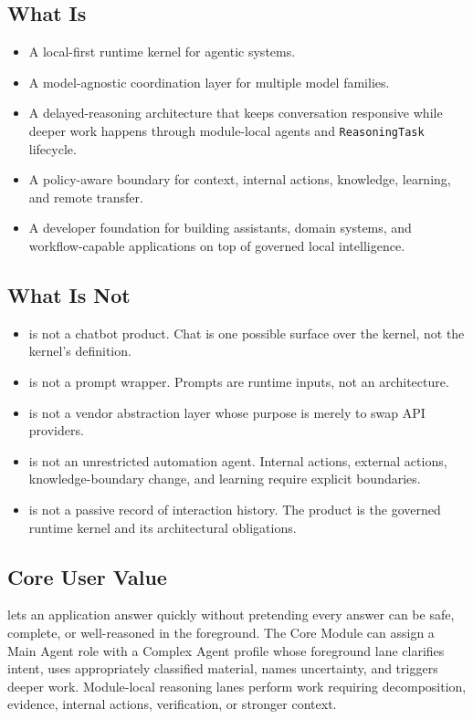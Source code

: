 \documentclass[11pt]{report}
\begin{document}
\subsection{What \Madre Is}

\begin{itemize}
	\item A local-first runtime kernel for agentic systems.
	\item A model-agnostic coordination layer for multiple model families.
	\item A delayed-reasoning architecture that keeps conversation responsive while deeper work happens through module-local agents and \texttt{ReasoningTask} lifecycle.
	\item A policy-aware boundary for context, internal actions, knowledge, learning, and remote transfer.
	\item A developer foundation for building assistants, domain systems, and workflow-capable applications on top of governed local intelligence.
\end{itemize}

\subsection{What \Madre Is Not}

\begin{itemize}
	\item \Madre is not a chatbot product. Chat is one possible surface over the kernel, not the kernel's definition.
	\item \Madre is not a prompt wrapper. Prompts are runtime inputs, not an architecture.
	\item \Madre is not a vendor abstraction layer whose purpose is merely to swap API providers.
	\item \Madre is not an unrestricted automation agent. Internal actions, external actions, knowledge-boundary change, and learning require explicit boundaries.
	\item \Madre is not a passive record of interaction history. The product is the governed runtime kernel and its architectural obligations.
\end{itemize}

\subsection{Core User Value}

\Madre lets an application answer quickly without pretending every answer can be safe, complete, or well-reasoned in the foreground. The Core Module can assign a Main Agent role with a Complex Agent profile whose foreground lane clarifies intent, uses appropriately classified material, names uncertainty, and triggers deeper work. Module-local reasoning lanes perform work requiring decomposition, evidence, internal actions, verification, or stronger context.
\end{document}
